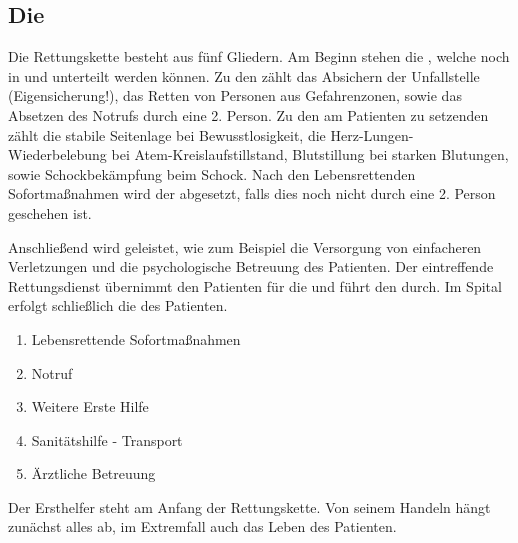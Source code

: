\subsection{Die }
\label{topic:rettungskette}






{
Die Rettungskette besteht aus fünf Gliedern. Am Beginn
stehen die , welche noch
in  und  unterteilt werden
können. Zu den  zählt das
Absichern der Unfallstelle (Eigensicherung!), das Retten von
Personen aus Gefahrenzonen, sowie das Absetzen des Notrufs
durch eine 2. Person. Zu den am Patienten zu setzenden
 zählt die stabile
Seitenlage bei Bewusstlosigkeit, die
Herz-Lungen-Wiederbelebung bei Atem-Kreislaufstillstand,
Blutstillung bei starken Blutungen, sowie Schockbekämpfung
beim Schock. Nach den Lebensrettenden Sofortmaßnahmen wird
der  abgesetzt, falls dies noch nicht durch eine
2. Person geschehen ist.

Anschließend wird  geleistet, wie
zum Beispiel die Versorgung von einfacheren Verletzungen und
die psychologische Betreuung des Patienten. Der eintreffende
Rettungsdienst übernimmt den Patienten für die
 und führt den  durch. Im
Spital erfolgt schließlich die  des
Patienten.

}{
\begin{enumerate}
  \item Lebensrettende Sofortmaßnahmen
  \item Notruf
  \item Weitere Erste Hilfe
  \item Sanitätshilfe - Transport
  \item Ärztliche Betreuung
\end{enumerate}
}
{}{}{}




Der Ersthelfer steht am Anfang der Rettungskette. Von seinem
Handeln hängt zunächst alles ab, im Extremfall auch das
Leben des Patienten.

